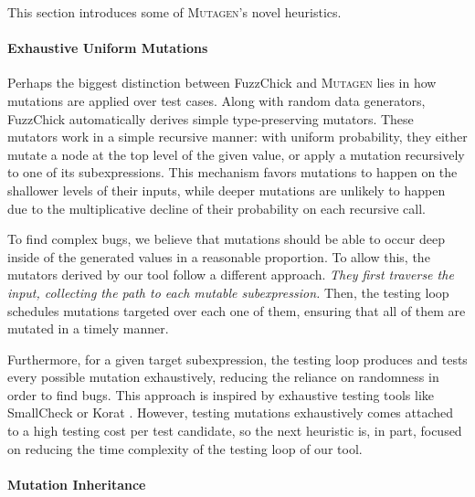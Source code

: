 \documentclass[10pt,conference]{IEEEtran}
\newcommand{\ourtool}{\textsc{Mutagen}\xspace}
\begin{document}
\noindent This section introduces some of \ourtool's novel heuristics.

\paragraph{Exhaustive Uniform Mutations}

Perhaps the biggest distinction between FuzzChick and \ourtool lies in how
mutations are applied over test cases.
%
Along with random data generators, FuzzChick automatically derives simple
type-preserving mutators.
%
These mutators work in a simple recursive manner: with uniform probability, they
either mutate a node at the top level of the given value, or apply a mutation
recursively to one of its subexpressions.
%
This mechanism favors mutations to happen on the shallower levels of their
inputs, while deeper mutations are unlikely to happen due to the multiplicative
decline of their probability on each recursive call.

To find complex bugs, we believe that mutations should be able to occur deep
inside of the generated values in a reasonable proportion.
%
To allow this, the mutators derived by our tool follow a different approach.
%
\emph{They first traverse the input, collecting the path to each mutable
  subexpression.}
%
Then, the testing loop schedules mutations targeted over each one of them,
ensuring that all of them are mutated in a timely manner.

Furthermore, for a given target subexpression, the testing loop produces and
tests every possible mutation exhaustively, reducing the reliance on randomness
in order to find bugs.
%
%
This approach is inspired by exhaustive testing tools like SmallCheck
\cite{runciman2008smallcheck} or Korat \cite{boyapati2002korat}.
%
However, testing mutations exhaustively comes attached to a high testing cost
per test candidate, so the next heuristic is, in part, focused on reducing the
time complexity of the testing loop of our tool.

\paragraph{Mutation Inheritance}
\end{document}
